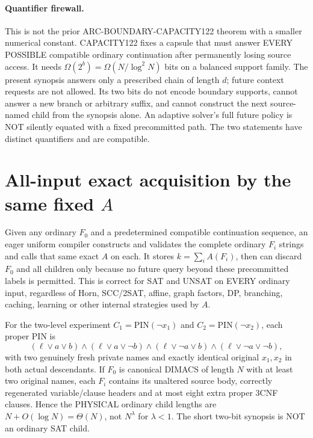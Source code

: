\documentclass[11pt]{article}
\begin{document}
\paragraph{Quantifier firewall.} This is not the prior
ARC-BOUNDARY-CAPACITY122 theorem with a smaller numerical constant.
CAPACITY122 fixes a capsule that must answer EVERY POSSIBLE compatible
ordinary continuation after permanently losing source access. It needs
$\Omega(2^b)=\Omega(N/\log^2N)$ bits on a balanced support family.
The present synopsis answers only a prescribed chain of length $d$;
future context requests are not allowed. Its two bits do not encode
boundary supports, cannot answer a new branch or arbitrary suffix,
and cannot construct the next source-named child from the synopsis alone.
An adaptive solver's full future policy is NOT silently equated with a
fixed precommitted path. The two statements have distinct quantifiers
and are compatible.

\section{All-input exact acquisition by the same fixed $A$}
Given any ordinary $F_0$ and a predetermined compatible continuation
sequence, an eager uniform compiler constructs and validates the complete
ordinary $F_i$ strings and calls that same exact $A$ on each.
It stores $k=\sum_i A(F_i)$, then can discard $F_0$ and all children
only because no future query beyond these precommitted labels is permitted.
This is correct for SAT and UNSAT on EVERY ordinary input, regardless
of Horn, SCC/2SAT, affine, graph factors, DP, branching, caching,
learning or other internal strategies used by $A$.

For the two-level experiment $C_1=\mathrm{PIN}(\neg x_1)$ and
$C_2=\mathrm{PIN}(\neg x_2)$, each proper PIN is
\[
 (\ell\lor a\lor b)\land(\ell\lor a\lor\neg b)
 \land(\ell\lor\neg a\lor b)
 \land(\ell\lor\neg a\lor\neg b),
\]
with two genuinely fresh private names and exactly identical original
$x_1,x_2$ in both actual descendants. If $F_0$ is canonical DIMACS
of length $N$ with at least two original names, each $F_i$ contains its
unaltered source body, correctly regenerated variable/clause headers and
at most eight extra proper 3CNF clauses. Hence the PHYSICAL ordinary
child lengths are $N+O(\log N)=\Theta(N)$, not $N^{\lambda}$ for
$\lambda<1$. The short two-bit synopsis is NOT an ordinary SAT child.
\end{document}
